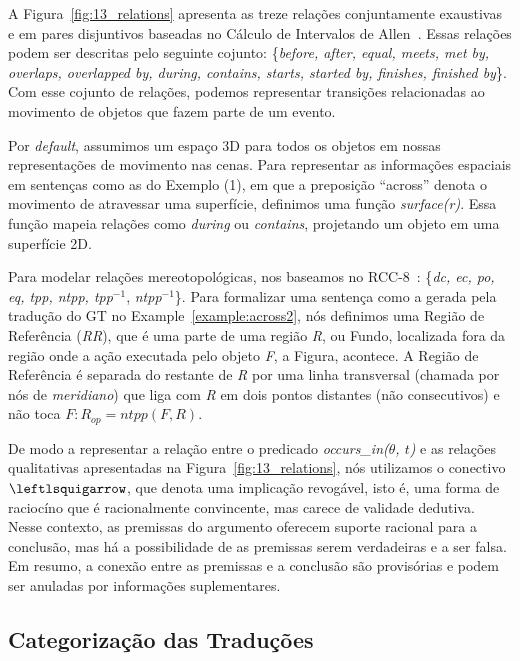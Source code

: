 \documentclass[a4paper, twocolumn, 11pt, twoside]{article}
\begin{document}
A Figura~\ref{fig:13_relations} apresenta  as treze relações conjuntamente exaustivas e em pares disjuntivos baseadas no Cálculo de Intervalos de Allen~\citep{allen1983maintaining}.
Essas relações podem ser descritas pelo seguinte cojunto: \{\textit{before, after, equal, meets, met by, overlaps, overlapped by, during, contains, starts, started by, finishes, finished by}\}. 
Com esse cojunto de relações, podemos representar transições relacionadas ao movimento de objetos que fazem parte de um evento.

Por \textit{default}, assumimos um espaço 3D para todos os objetos em nossas representações de movimento nas cenas. Para representar as informações espaciais em sentenças como as do Exemplo (1), em que a preposição ``across'' denota
o movimento de atravessar uma superfície, definimos uma função \textit{surface(r)}. Essa função mapeia relações como
\textit{during} ou \textit{contains}, projetando um objeto em uma superfície 2D.

Para modelar relações mereotopológicas, nos baseamos no RCC-8~\citep{randell1992spatial}: \{\textit{dc, ec, po, eq, tpp, ntpp, tpp}${^{-1}}$, \textit{ntpp}${^{-1}}$\}.
Para formalizar uma sentença como a gerada pela tradução do GT no Example~\ref{example:across2}, nós definimos uma Região de Referência (\textit{RR}), que é uma parte de 
uma região \textit{R}, ou Fundo, localizada fora da região onde a ação executada pelo objeto \textit{F}, a Figura, 
acontece. A Região de Referência é separada do restante de \textit{R} por uma linha transversal (chamada por nós de \textit{meridiano}) 
que liga com \textit{R} em dois pontos distantes (não consecutivos) e não toca $F: R_{op} = ntpp(F, R)$.

De modo a representar a relação entre o predicado \textit{occurs\_in($\theta$, $t$)} e as relações qualitativas 
apresentadas na Figura~\ref{fig:13_relations}, nós utilizamos o conectivo $\leftlsquigarrow$, que denota uma implicação
revogável, isto é, uma forma de raciocíno que é racionalmente convincente, mas carece de validade dedutiva. 
Nesse contexto, as premissas do argumento oferecem suporte racional para a conclusão, mas há a possibilidade 
de as premissas serem verdadeiras e a ser falsa. Em resumo, a conexão entre as premissas e a conclusão são provisórias
e podem ser anuladas por informações suplementares.

\subsection{Categorização das Traduções}
\end{document}
